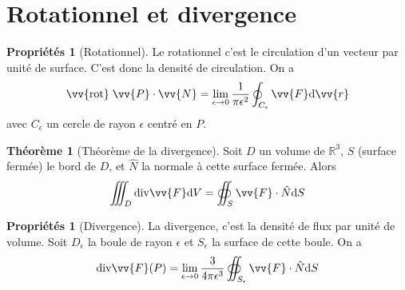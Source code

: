 \documentclass[11pt,a4paper]{article}
\theoremstyle{definition}
\newtheorem{myprop}[mydef]{Propriétés}
\newtheorem{mytheo}[mydef]{Théorème}
\newcommand{\R}{\mathbb{R}}
\newcommand{\dif}{\mathrm{d}}
\renewcommand{\div}{\mathrm{div}}
\newcommand{\rot}{\vv{\mathrm{rot}}\;}
\newcommand{\fl}{\rightarrow}
\begin{document}
\section{Rotationnel et divergence}

\begin{myprop}[Rotationnel]
Le rotationnel c'est le circulation d'un vecteur par unité de surface. C'est donc la densité de circulation. On a
\[ \rot \vv{P} \cdot \vv{N} = \lim_{\epsilon \fl 0} \frac 1{\pi \epsilon^2} \oint_{C_\epsilon} \vv{F} \dif \vv{r} \]
avec $C_\epsilon$ un cercle de rayon $\epsilon$ centré en $P$.
\end{myprop}

\begin{mytheo}[Théorème de la divergence]

Soit $D$ un volume de $\R^3$, $S$ (surface fermée) le bord de $D$, et $\hat{N}$ la normale à cette surface fermée. Alors
\[ \iiint_D \div \vv{F} \dif V = \oiint_S \vv{F} \cdot \hat{N} \dif S \]

\end{mytheo}

\begin{myprop}[Divergence]
La divergence, c'est la densité de flux par unité de volume. Soit $D_{\epsilon}$ la boule de rayon $\epsilon$ et $S_{\epsilon}$ la surface de cette boule. On a
\[ \div \vv{F}(P) = \lim_{\epsilon \fl 0} \frac{3}{4 \pi \epsilon^3} \oiint_{S_{\epsilon}} \vv{F} \cdot \hat{N} \dif S \]
\end{myprop}
\end{document}
